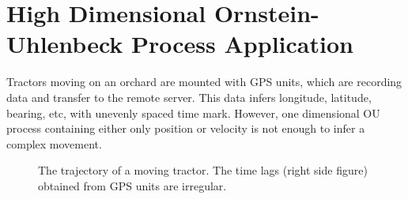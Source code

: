 \section{High Dimensional Ornstein-Uhlenbeck Process Application}\label{SectionHighDimensionalOU}

Tractors moving on an orchard are mounted with GPS units, which are recording data and transfer to the remote server. This data infers longitude, latitude, bearing, etc, with unevenly spaced time mark. However, one dimensional OU process containing either only position or velocity is not enough to infer a complex movement. 

\begin{figure}[h]
\centering
{}
\caption{The trajectory of a moving tractor. The time lags (right side figure) obtained from GPS units are irregular.}
\label{realdatareview}
\end{figure}

